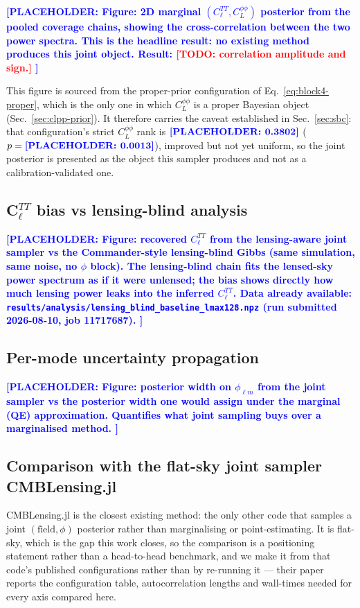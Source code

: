 \documentclass[twocolumn,superscriptaddress,aps,prl,floatfix]{revtex4-2}
\newcommand{\cl}{C_\ell}
\newcommand{\clpp}{C_L^{\phi\phi}}
\newcommand{\todo}[1]{\textcolor{red}{\textbf{[TODO: #1]}}}
\newcommand{\placeholder}[1]{\textcolor{blue}{\textbf{[PLACEHOLDER: #1]}}}
\begin{document}
\placeholder{
Figure: 2D marginal $(\cl^{TT}, \clpp)$ posterior from the pooled coverage
chains, showing the cross-correlation between the two power spectra.
This is the headline result: no existing method produces this joint object.
Result: \todo{correlation amplitude and sign.}
}

This figure is sourced from the proper-prior configuration of
Eq.~\eqref{eq:block4-proper}, which is the only one in which $\clpp$ is a
proper Bayesian object (Sec.~\ref{sec:clpp-prior}). It therefore carries the
caveat established in Sec.~\ref{sec:sbc}: that configuration's strict $\clpp$
rank is $\placeholder{0.3802}$ ($p = \placeholder{0.0013}$), improved but not
yet uniform, so the joint posterior is presented as the object this sampler
produces and not as a calibration-validated one.

\subsection{C$_\ell^{TT}$ bias vs lensing-blind analysis}
\label{sec:cl-bias}

\placeholder{
Figure: recovered $\cl^{TT}$ from the lensing-aware joint sampler vs the
Commander-style lensing-blind Gibbs (same simulation, same noise, no $\phi$
block). The lensing-blind chain fits the lensed-sky power spectrum as if it were
unlensed; the bias shows directly how much lensing power leaks into the
inferred $\cl^{TT}$.
Data already available: \texttt{results/analysis/lensing\_blind\_baseline\_lmax128.npz}
(run submitted 2026-08-10, job 11717687).
}

\subsection{Per-mode uncertainty propagation}
\label{sec:uncertainty}

\placeholder{
Figure: posterior width on $\phi_{\ell m}$ from the joint sampler vs the
posterior width one would assign under the marginal (QE) approximation.
Quantifies what joint sampling buys over a marginalised method.
}


\subsection{Comparison with the flat-sky joint sampler CMBLensing.jl}
\label{sec:cmblensing}

CMBLensing.jl \citep{CMBLensing,Millea:2020} is the closest existing method:
the only other code that samples a joint $(\text{field}, \phi)$ posterior rather
than marginalising or point-estimating. It is flat-sky, which is the gap this
work closes, so the comparison is a positioning statement rather than a
head-to-head benchmark, and we make it from that code's published
configurations rather than by re-running it --- their paper reports the
configuration table, autocorrelation lengths and wall-times needed for every
axis compared here.
\end{document}
